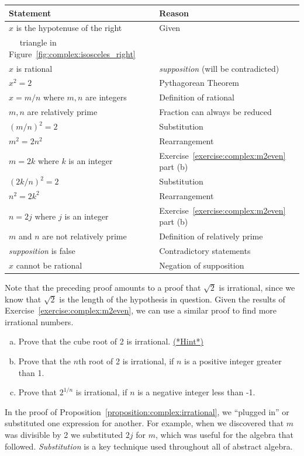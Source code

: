 \begin{tabular}{l| l}
Statement& Reason\\
\hline
$x$ is the hypotenuse of the right & Given\\
~~ triangle in Figure~\ref{fig:complex:isosceles_right} & ~\\
$x$ is rational & \emph{supposition} (will be contradicted)\\
$x^2 = 2$ & Pythagorean Theorem\\
$x = m/n$ where $m,n$ are integers& Definition of rational\\
$m, n$ are relatively prime & Fraction can always be reduced\\
$(m/n)^2 = 2$ & Substitution\\
$m^2 = 2n^2$ & Rearrangement\\
$m = 2k$ where $k$ is an integer & Exercise~\ref{exercise:complex:m2even} part (b)\\
$(2k/n)^2 = 2$ & Substitution\\
$n^2 = 2k^2$& Rearrangement\\
$n = 2j$ where  $j$ is an integer&Exercise~\ref{exercise:complex:m2even} part (b)\\
$m$ and $n$ are not relatively prime& Definition of relatively prime\\
\emph{supposition} is false & Contradictory statements\\
$x$ cannot be rational &  Negation of supposition
\end{tabular}

Note that the preceding proof amounts to a proof that $\sqrt{2}$ is irrational, since we know that $\sqrt{2}$ is the length of the hypothesis in question. Given the results of Exercise~\ref{exercise:complex:m2even}, we can use a similar proof to find more irrational numbers.

\begin{exercise}{6}
\begin{enumerate}[(a)]
\item
Prove that the cube root of 2 is irrational.
\hyperref[sec:complex:hints]{(*Hint*)} 
\item
Prove that the $n$th root of 2 is irrational, if $n$ is a positive integer greater than 1.
\item
Prove that $2^{1/n}$ is irrational, if $n$ is a negative integer less than -1.
\end{enumerate}
\end{exercise}

In the proof of Proposition~\ref{proposition:complex:irrational},  we ``plugged in'' or substituted one expression for another.   For example, when we discovered that $m$ was divisible by 2 we substituted $2j$ for $m$, which was useful for the algebra that followed.
\emph{Substitution} is a key technique used throughout all of abstract algebra.

